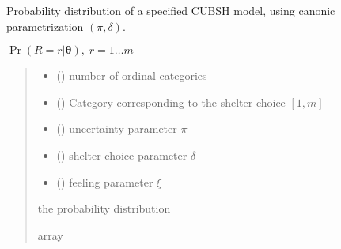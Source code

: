 \documentclass[letterpaper,10pt,english]{sphinxmanual}
\begin{document}

\begin{fulllineitems}
\label{\detokenize{cubmods:cubmods.cubsh.pmf_delta}}
\pysigstartsignatures
{}
\pysigstopsignatures
\sphinxAtStartPar
Probability distribution of a specified CUBSH model,
using canonic parametrization \((\pi, \delta)\).

\sphinxAtStartPar
\(\Pr(R = r | \pmb\theta),\; r=1 \ldots m\)
\begin{quote}\begin{description}
\begin{itemize}
\item {} 
\sphinxAtStartPar
{} () \textendash{} number of ordinal categories

\item {} 
\sphinxAtStartPar
{} () \textendash{} Category corresponding to the shelter choice \([1,m]\)

\item {} 
\sphinxAtStartPar
{} () \textendash{} uncertainty parameter \(\pi\)

\item {} 
\sphinxAtStartPar
{} () \textendash{} shelter choice parameter \(\delta\)

\item {} 
\sphinxAtStartPar
{} () \textendash{} feeling parameter \(\xi\)

\end{itemize}

\sphinxAtStartPar
the probability distribution

\sphinxAtStartPar
array

\end{description}\end{quote}

\end{fulllineitems}
\end{document}
